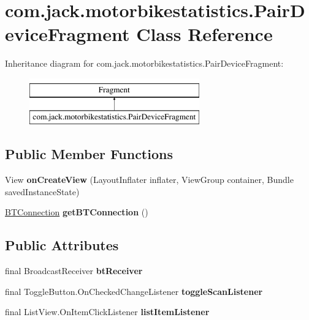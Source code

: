 \hypertarget{classcom_1_1jack_1_1motorbikestatistics_1_1_pair_device_fragment}{}\section{com.\+jack.\+motorbikestatistics.\+Pair\+Device\+Fragment Class Reference}
\label{classcom_1_1jack_1_1motorbikestatistics_1_1_pair_device_fragment}
Inheritance diagram for com.\+jack.\+motorbikestatistics.\+Pair\+Device\+Fragment\+:\begin{figure}[H]
\begin{center}
\leavevmode
\includegraphics[height=2.000000cm]{classcom_1_1jack_1_1motorbikestatistics_1_1_pair_device_fragment}
\end{center}
\end{figure}
\subsection*{Public Member Functions}
\begin{DoxyCompactItemize}
\item 
\mbox{\label{classcom_1_1jack_1_1motorbikestatistics_1_1_pair_device_fragment_afc7756a10d0798aa2493b9c7f6b010ad}} 
View {\bfseries on\+Create\+View} (Layout\+Inflater inflater, View\+Group container, Bundle saved\+Instance\+State)
\item 
\mbox{\label{classcom_1_1jack_1_1motorbikestatistics_1_1_pair_device_fragment_a32debe1358d94bb1c972137f60d1aa36}} 
\hyperlink{classcom_1_1jack_1_1motorbikestatistics_1_1_b_t_connection}{B\+T\+Connection} {\bfseries get\+B\+T\+Connection} ()
\end{DoxyCompactItemize}
\subsection*{Public Attributes}
\begin{DoxyCompactItemize}
\item 
final Broadcast\+Receiver {\bfseries bt\+Receiver}
\item 
final Toggle\+Button.\+On\+Checked\+Change\+Listener {\bfseries toggle\+Scan\+Listener}
\item 
\mbox{\label{classcom_1_1jack_1_1motorbikestatistics_1_1_pair_device_fragment_a4ec3a304c1da2bc4e4d2ca16da764e23}} 
final List\+View.\+On\+Item\+Click\+Listener {\bfseries list\+Item\+Listener}
\end{DoxyCompactItemize}


